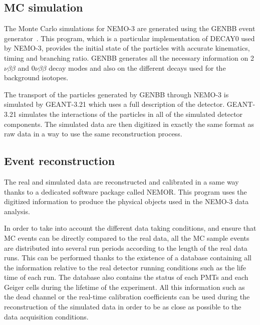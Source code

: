 \documentclass[main.tex]{subfiles}
\begin{document}
\subsection{MC simulation}\label{sec:MCsimu}


\NI The Monte Carlo simulations for NEMO-3 are generated using the GENBB event generator~\cite{GENBB}. This program, which is a particular implementation of DECAY0 used by NEMO-3, provides the initial state of the particles with accurate kinematics, timing and branching ratio. GENBB generates all the necessary information on 2$\nu\beta\beta$ and 0$\nu\beta\beta$ decay modes and also on the different decays used for the background isotopes.


\bigskip


\NI The transport of the particles generated by GENBB through NEMO-3 is simulated by GEANT-3.21 \cite{GEANT3} which uses a full description of the detector. GEANT-3.21 simulates the interactions of the particles in all of the simulated detector components. The simulated data are then digitized in exactly the same format as raw data in a way to use the same reconstruction process.   


\subsection{Event reconstruction}\label{sec:RecoNEMOR}


\NI The real and simulated data are reconstructed and calibrated in a same way thanks to a dedicated software package called NEMOR. This program uses the digitized information to produce the physical objects used in the NEMO-3 data analysis. 


\bigskip


\NI In order to take into account the different data taking conditions, and ensure that MC events can be directly compared to the real data, all the MC sample events are distributed into several run periods according to the length of the real data runs.  This can be performed thanks to the existence of a database containing all the information relative to the real detector running conditions such as the life time of each run. The database also contains the status of each PMTs and each Geiger cells during the lifetime of the experiment. All this information such as the dead channel or the real-time calibration coefficients can be used during the reconstruction of the simulated data in order to be as close as possible to the data acquisition conditions.  
\end{document}
